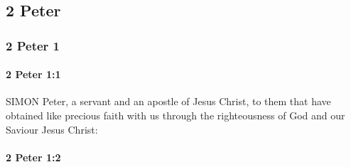 \subsection{2 Peter}
	\label{2PETER}

	\subsubsection{2 Peter 1} %
		\label{2PETER-1}
		
		\paragraph{2 Peter 1:1} %
			\label{2PETER-1-1}

			SIMON Peter, a servant and an apostle of Jesus Christ, to them that have obtained like precious faith with us through the righteousness of God and our Saviour Jesus Christ:

			\begin{framed}
			\scriptsize
				\begin{compactdesc}
					\item[SBLG] 
				\end{compactdesc}
			\end{framed}

		\paragraph{2 Peter 1:2} %
			\label{2PETER-1-2}

